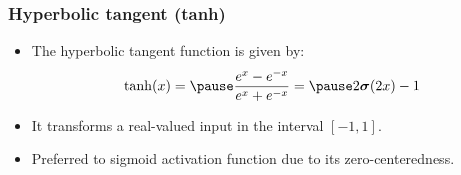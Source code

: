 \documentclass[smaller]{beamer}
\begin{document}
\begin{frame}
  \frametitle{Hyperbolic tangent (tanh)}
  \begin{itemize}[<+->]
  \item The hyperbolic tangent function is given by:
    \begin{equation}
      \tanh(x) = \pause \fr{e^x - e^{-x}}{e^x + e^{-x}} = \pause 2\bm\sigma(2x)  - 1
    \end{equation}

  \item It transforms a real-valued input in the interval $[-1,1]$.


      \begin{figure}[t!]\centering
      
    \end{figure}

  \item Preferred to sigmoid activation function due to its zero-centeredness.
    
  \end{itemize}
\end{frame}
\end{document}
